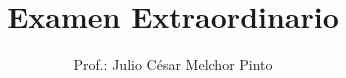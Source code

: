 \documentclass[12pt,addpoints]{evalua}
\title{Examen Extraordinario}
\author{Prof.: Julio César Melchor Pinto}
\begin{document}
\begin{questions}
    \question[15] 
    \newpage
    \question[10] 
    \begin{multicols}{2}
        \question[15] 
    \end{multicols}
    \question[20] 
    \question[20] 
    \newpage
    \question[10] 
    \question[10]  
\end{questions}
\end{document}
